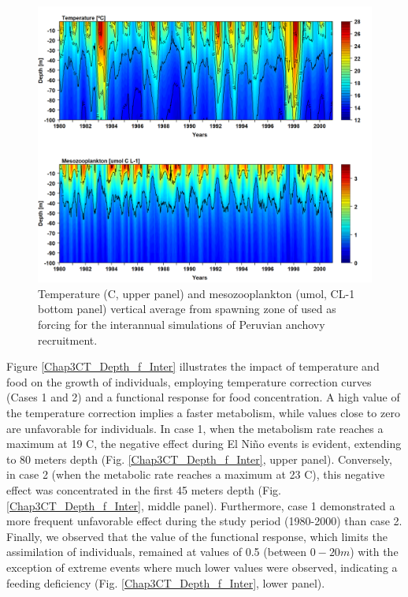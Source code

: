 \begin{figure}[H]
	\includegraphics[width=1.0\textwidth]{figures/Chap3TempMesoInter.png}
	\centering
	\caption{Temperature (\textdegree C, upper panel) and mesozooplankton (umol, CL-1 bottom panel) vertical average from spawning zone of used as forcing for the interannual simulations of Peruvian anchovy recruitment.}
	\label{Chap3TempMesoInter}
\end{figure}

Figure \ref{Chap3CT_Depth_f_Inter} illustrates the impact of temperature and food on the growth of individuals, employing temperature correction curves (Cases 1 and 2) and a functional response for food concentration. A high value of the temperature correction implies a faster metabolism, while values close to zero are unfavorable for individuals. In case 1, when the metabolism rate reaches a maximum at 19 \textdegree C, the negative effect during El Niño events is evident, extending to 80 meters depth (Fig. \ref{Chap3CT_Depth_f_Inter}, upper panel). Conversely, in case 2 (when the metabolic rate reaches a maximum at 23 \textdegree C), this negative effect was concentrated in the first 45 meters depth (Fig. \ref{Chap3CT_Depth_f_Inter}, middle panel). Furthermore, case 1 demonstrated a more frequent unfavorable effect during the study period (1980-2000) than case 2. Finally, we observed that the value of the functional response, which limits the assimilation of individuals, remained at values of 0.5 (between $0-20m$) with the exception of extreme events where much lower values were observed, indicating a feeding deficiency (Fig. \ref{Chap3CT_Depth_f_Inter}, lower panel).\\

